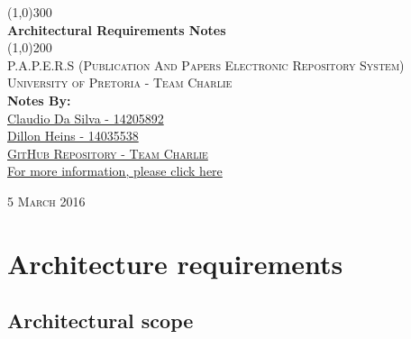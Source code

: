 \documentclass{article}
\begin{document}
	
	\begin{titlepage}
		\begin{center}
			
			\line(1,0){300}\\
			[6mm]
			\huge{
				\bfseries Architectural Requirements Notes
			}\\
			[2mm]
			\line(1,0){200}\\
			[15mm]
			\textsc{\large P.A.P.E.R.S (Publication And Papers Electronic Repository System)}\\
			[7.5mm]
			\textsc{\large University of Pretoria - Team Charlie}\\
			[20mm]
			\large{\textbf{Notes By:}}\\
			[2mm]
			\large{
				\href{https://github.com/ClaudioMDS}{Claudio Da Silva - 14205892}\\
				\href{https://github.com/DillonHeins}{Dillon Heins - 14035538}
			}\\
			[4cm]
			
			\href{https://github.com/DillonHeins/Charlie}{\textsc{\Large GitHub Repository - Team Charlie}\\[2mm]
				For more information, please click here}
			
		\end{center}	
		\begin{flushright}
			\textsc{\large 5 March 2016}
		\end{flushright}
	\end{titlepage}
	
	\cleardoublepage
	\thispagestyle{empty}
	\tableofcontents
	\cleardoublepage
	\listoffigures
	\cleardoublepage
	\setcounter{page}{1}
	\section{Architecture requirements}\label{sec:requirements}
	
	\subsection{Architectural scope}\label{subsec:scope}
\end{document}
